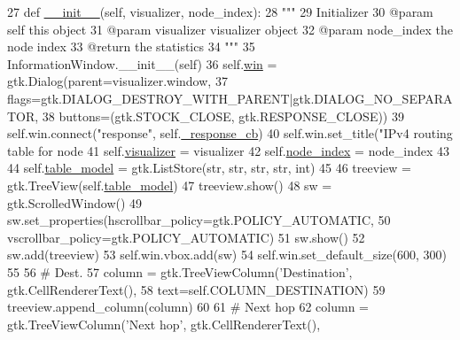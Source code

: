 \begin{DoxyCode}
27     \textcolor{keyword}{def }\hyperlink{classipv4__routing__table_1_1ShowIpv4RoutingTable_a83fbfa89f555d17844f71ddc3146557f}{\_\_init\_\_}(self, visualizer, node\_index):
28         \textcolor{stringliteral}{"""}
29 \textcolor{stringliteral}{        Initializer}
30 \textcolor{stringliteral}{        @param self this object}
31 \textcolor{stringliteral}{        @param visualizer visualizer object}
32 \textcolor{stringliteral}{        @param node\_index the node index}
33 \textcolor{stringliteral}{        @return the statistics}
34 \textcolor{stringliteral}{        """}
35         InformationWindow.\_\_init\_\_(self)
36         self.\hyperlink{classipv4__routing__table_1_1ShowIpv4RoutingTable_aef66404f7aed5614e7b2444d7a28f010}{win} = gtk.Dialog(parent=visualizer.window,
37                               flags=gtk.DIALOG\_DESTROY\_WITH\_PARENT|gtk.DIALOG\_NO\_SEPARATOR,
38                               buttons=(gtk.STOCK\_CLOSE, gtk.RESPONSE\_CLOSE))
39         self.win.connect(\textcolor{stringliteral}{"response"}, self.\hyperlink{classipv4__routing__table_1_1ShowIpv4RoutingTable_a12e29ffa6152cb1c2723d80b38e1159c}{\_response\_cb})
40         self.win.set\_title(\textcolor{stringliteral}{"IPv4 routing table for node %
41         self.\hyperlink{classipv4__routing__table_1_1ShowIpv4RoutingTable_aaffe658fdd5746d8db628aae110374fc}{visualizer} = visualizer
42         self.\hyperlink{classipv4__routing__table_1_1ShowIpv4RoutingTable_af135b23094260a6c002cc7d8bb6b479b}{node\_index} = node\_index
43 
44         self.\hyperlink{classipv4__routing__table_1_1ShowIpv4RoutingTable_a6759a8a1af2db9f1d872b422e2d268a6}{table\_model} = gtk.ListStore(str, str, str, str, int)
45 
46         treeview = gtk.TreeView(self.\hyperlink{classipv4__routing__table_1_1ShowIpv4RoutingTable_a6759a8a1af2db9f1d872b422e2d268a6}{table\_model})
47         treeview.show()
48         sw = gtk.ScrolledWindow()
49         sw.set\_properties(hscrollbar\_policy=gtk.POLICY\_AUTOMATIC,
50                           vscrollbar\_policy=gtk.POLICY\_AUTOMATIC)
51         sw.show()
52         sw.add(treeview)
53         self.win.vbox.add(sw)
54         self.win.set\_default\_size(600, 300)
55         
56         \textcolor{comment}{# Dest.}
57         column = gtk.TreeViewColumn(\textcolor{stringliteral}{'Destination'}, gtk.CellRendererText(),
58                                     text=self.COLUMN\_DESTINATION)
59         treeview.append\_column(column)
60 
61         \textcolor{comment}{# Next hop}
62         column = gtk.TreeViewColumn(\textcolor{stringliteral}{'Next hop'}, gtk.CellRendererText(),
}
\end{DoxyCode}
